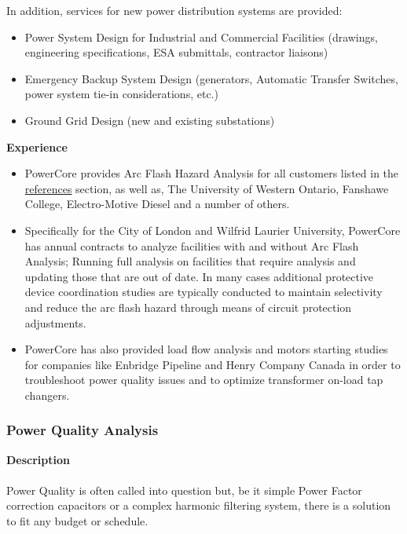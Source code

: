 In addition, services for new power distribution systems are provided:
\begin{itemize}
	\item Power System Design for Industrial and Commercial Facilities (drawings, engineering specifications, ESA submittals, contractor liaisons)
	\item Emergency Backup System Design (generators, Automatic Transfer Switches, power system tie-in considerations, etc.)
	\item Ground Grid Design (new and existing substations)
\end{itemize}

\textbf{Experience}\\
\begin{itemize}
	\item PowerCore provides Arc Flash Hazard Analysis for all customers listed in the \hyperref[Sub:Ref]{references} section, as well as, The University of Western Ontario, Fanshawe College, Electro-Motive Diesel and a number of others. 
	\item Specifically for the City of London and Wilfrid Laurier University, PowerCore has annual contracts to analyze facilities with and without Arc Flash Analysis; Running full analysis on facilities that require analysis and updating those that are out of date. In many cases additional protective device coordination studies are typically conducted to maintain selectivity and reduce the arc flash hazard through means of circuit protection adjustments. 
	\item PowerCore has also provided load flow analysis and motors starting studies for companies like Enbridge Pipeline and Henry Company Canada in order to troubleshoot power quality issues and to optimize transformer on-load tap changers.

\end{itemize}

\subsubsection{Power Quality Analysis}
\label{Sub:Exp:PQA}

\textbf{Description}\\
\\	
Power Quality is often called into question but, be it simple Power Factor correction capacitors or a complex harmonic filtering system, there is a solution to fit any budget or schedule.\\ 

